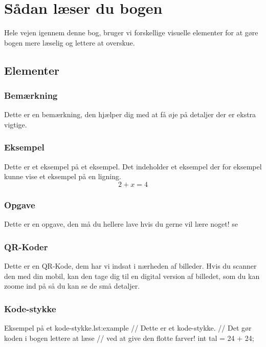 \cleardoublepage
\chapter{Sådan læser du bogen}
Hele vejen igennem denne bog, bruger vi forskellige visuelle elementer for at gøre bogen mere læselig og lettere at overskue.

\section{Elementer}

\subsection{Bemærkning}
\begin{remark}
	Dette er en bemærkning, den hjælper dig med at få øje på detaljer der er ekstra vigtige.
\end{remark}

\subsection{Eksempel}
\begin{example}
	Dette er et eksempel på et eksempel. Det indeholder et eksempel der for eksempel kunne vise et eksempel på en ligning. 
	$$2+x=4$$
\end{example}

\subsection{Opgave}
\begin{exercise}
	Dette er en opgave, den må du hellere lave hvis du gerne vil lære noget!
se\end{exercise}

\subsection{QR-Koder}
Dette er en QR-Kode, dem har vi indsat i nærheden af billeder. Hvis du scanner den med din mobil, kan den tage dig til en digital version af billedet, som du kan zoome ind på så du kan se de små detaljer.


\subsection{Kode-stykke}

\begin{JavaCodeH}{Eksempel på et kode-stykke.}{lst:example}
	// Dette er et kode-stykke.
	// Det gør koden i bogen lettere at læse 
	// ved at give den flotte farver!
	int tal = 24 + 24;
\end{JavaCodeH}